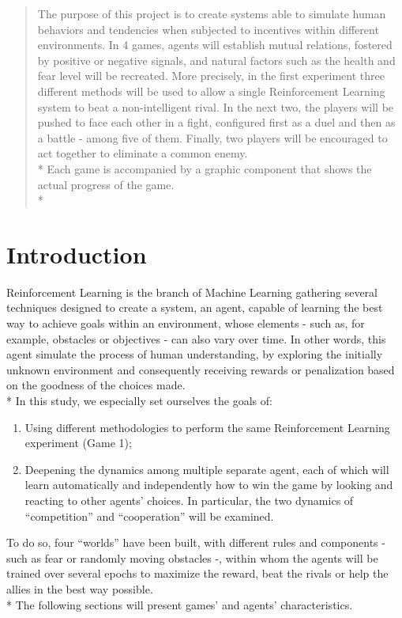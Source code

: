 \begin{abstract}
The purpose of this project is to create systems able to simulate human behaviors and tendencies when subjected to incentives within different environments. In 4 games, agents will establish mutual relations, fostered by positive or negative signals, and natural factors such as the health and fear level will be recreated. More precisely, in the first experiment three different methods will be used to allow a single Reinforcement Learning system to beat a non-intelligent rival. In the next two,
the players will be pushed to face each other in a fight, configured first as a duel and then as a battle - among five of them. Finally, two players will be encouraged to act together to eliminate a common enemy.\\*
Each game is accompanied by a graphic component that shows the actual progress of the game.\\*
\end{abstract}
\newpage
\newpage
\tableofcontents
\newpage
\section{Introduction}
Reinforcement Learning is the branch of Machine Learning gathering several techniques designed to create a system, an agent, capable of learning the best way to achieve goals within an environment, whose elements - such as, for example, obstacles or objectives - can also vary over time. In other words, this agent simulate the process of human understanding, by exploring the initially unknown environment and consequently receiving rewards or penalization based on the goodness of the choices made.\\*
In this study, we especially set ourselves the goals of:
\begin{enumerate}
  \item Using different methodologies to perform the same Reinforcement Learning experiment (Game 1);
  \item Deepening the dynamics among multiple separate agent, each of which will learn automatically and independently how to win the game by looking and reacting to other agents' choices. In particular, the two dynamics of ``competition'' and ``cooperation'' will be examined.
\end{enumerate}
To do so, four ``worlds'' have been built, with different rules and components - such as fear or randomly moving obstacles -, within whom the agents will be trained over several epochs to maximize the reward, beat the rivals or help the allies in the best way possible.\\*
The following sections will present games' and agents' characteristics. 
\newpage

